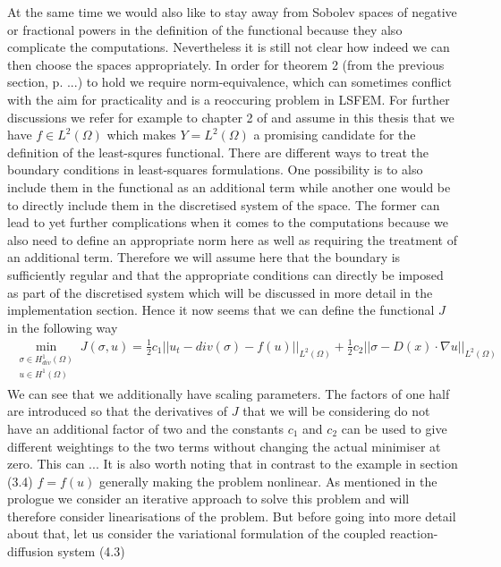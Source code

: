 \documentclass[../draft_1.tex]{subfiles}
\begin{document}
At the same time we would also like to stay away from Sobolev spaces of negative or fractional powers in the definition of the functional because they also complicate the computations. Nevertheless it is still not clear how indeed we can then choose the spaces appropriately. In order for theorem 2 (from the previous section, p. ...) to hold we require norm-equivalence, which can sometimes conflict with the aim for practicality and is a reoccuring problem in LSFEM. For further discussions we refer for example to chapter 2 of \cite{bochev2009least} and assume in this thesis that we have $f \in L^2(\Omega)$ which makes $Y = L^2(\Omega)$ a promising candidate for the definition of the least-squres functional. There are different ways to treat the boundary conditions in least-squares formulations. One possibility is to also include them in the functional as an additional term while another one would be to directly include them in the discretised system of the space. The former can lead to yet further complications when it comes to the computations because we also need to define an appropriate norm here as well as requiring the treatment of an additional term. Therefore we will assume here that the boundary is sufficiently regular and that the appropriate conditions can directly be imposed as part of the discretised system which will be discussed in more detail in the implementation section. Hence it now seems that we can define the functional $J$ in the following way
\begin{align}
\min_{ \substack{\sigma \in H_{div}^1(\Omega) \\ u \in H^1(\Omega)}} J(\sigma, u) = \frac{1}{2} c_1 || u_t - div(\sigma) - f(u) ||_{L^2(\Omega)} + \frac{1}{2} c_2 || \sigma - D(x) \cdot \nabla u || _{L^2(\Omega)} 
\end{align}
We can see that we additionally have scaling parameters. The factors of one half are introduced so that the derivatives of $J$ that we will be considering do not have an additional factor of two and the constants $c_1$ and $c_2$ can be used to give different weightings to the two terms without changing the actual minimiser at zero. This can ... It is also worth noting that in contrast to the example in section (3.4) $f = f(u)$ generally making the problem nonlinear. As mentioned in the prologue we consider an iterative approach to solve this problem and will therefore consider linearisations of the problem. But before going into more detail about that, let us consider the variational formulation of the coupled reaction-diffusion system (4.3)
\\
\end{document}
